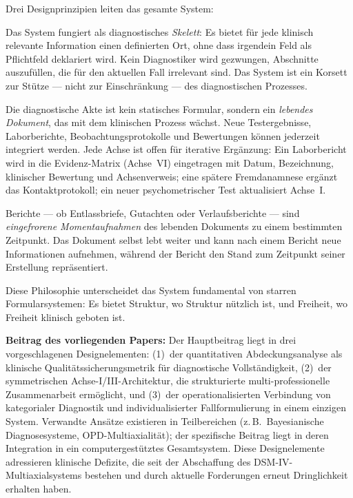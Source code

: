 \documentclass[11pt,a4paper]{article}
\begin{document}
Drei Designprinzipien leiten das gesamte System:

\begin{description}[style=nextline, leftmargin=1.5cm, font=\bfseries]
\item[Skelett-Prinzip] Das System fungiert als diagnostisches \textit{Skelett}: Es bietet f\"ur jede klinisch relevante Information einen definierten Ort, ohne dass irgendein Feld als Pflichtfeld deklariert wird. Kein Diagnostiker wird gezwungen, Abschnitte auszuf\"ullen, die f\"ur den aktuellen Fall irrelevant sind. Das System ist ein Korsett zur St\"utze --- nicht zur Einschr\"ankung --- des diagnostischen Prozesses.
\item[Lebendes Dokument] Die diagnostische Akte ist kein statisches Formular, sondern ein \textit{lebendes Dokument}, das mit dem klinischen Prozess w\"achst. Neue Testergebnisse, Laborberichte, Beobachtungsprotokolle und Bewertungen k\"onnen jederzeit integriert werden. Jede Achse ist offen f\"ur iterative Erg\"anzung: Ein Laborbericht wird in die Evidenz-Matrix (Achse~VI) eingetragen mit Datum, Bezeichnung, klinischer Bewertung und Achsenverweis; eine sp\"atere Fremdanamnese erg\"anzt das Kontaktprotokoll; ein neuer psychometrischer Test aktualisiert Achse~I.
\item[Bericht als Snapshot] Berichte --- ob Entlassbriefe, Gutachten oder Verlaufsberichte --- sind \textit{eingefrorene Momentaufnahmen} des lebenden Dokuments zu einem bestimmten Zeitpunkt. Das Dokument selbst lebt weiter und kann nach einem Bericht neue Informationen aufnehmen, w\"ahrend der Bericht den Stand zum Zeitpunkt seiner Erstellung repr\"asentiert.
\end{description}

Diese Philosophie unterscheidet das System fundamental von starren Formularsystemen: Es bietet Struktur, wo Struktur n\"utzlich ist, und Freiheit, wo Freiheit klinisch geboten ist.

\textbf{Beitrag des vorliegenden Papers:} Der Hauptbeitrag liegt in drei vorgeschlagenen Designelementen: (1)~der quantitativen Abdeckungsanalyse als klinische Qualit\"atssicherungsmetrik f\"ur diagnostische Vollst\"andigkeit, (2)~der symmetrischen Achse-I/III-Architektur, die strukturierte multi-professionelle Zusammenarbeit erm\"oglicht, und (3)~der operationalisierten Verbindung von kategorialer Diagnostik und individualisierter Fallformulierung in einem einzigen System. Verwandte Ans\"atze existieren in Teilbereichen (z.\,B.\ Bayesianische Diagnosesysteme, OPD-Multiaxialit\"at); der spezifische Beitrag liegt in deren Integration in ein computergest\"utztes Gesamtsystem. Diese Designelemente adressieren klinische Defizite, die seit der Abschaffung des DSM-IV-Multiaxialsystems bestehen und durch aktuelle Forderungen \citep{ErlichFirst2025} erneut Dringlichkeit erhalten haben.
\end{document}
